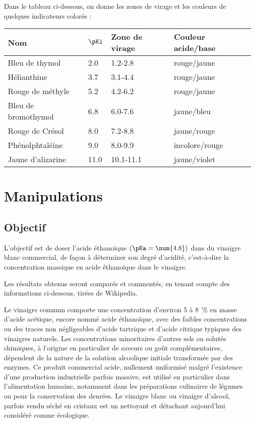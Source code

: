 \documentclass{tp}
\begin{document}
Dans le tableau ci-dessous, on donne les zones de virage et les couleurs de quelques indicateurs colorés :
\begin{center}
  \begin{tabular}{llll}
\toprule
 Nom  & $\pKi$  & Zone de virage & Couleur acide/base  \\
 \midrule
 Bleu de thymol & \num{2.0} & \num{1.2}-\num{2.8} & rouge/jaune \\
 Hélianthine  & \num{3.7} & \num{3.1}-\num{4.4} &  rouge/jaune  \\
 Rouge de méthyle  & \num{5.2} & \num{4.2}-\num{6.2} &  rouge/jaune  \\
 Bleu de bromothymol  & \num{6.8} & \num{6.0}-\num{7.6} &  jaune/bleu  \\
 Rouge de Crésol  & \num{8.0} & \num{7.2}-{8.8} &  jaune/rouge  \\
 Phénolphtaléine  & \num{9.0} & \num{8.0}-\num{9.9} &  incolore/rouge  \\
 Jaune d'alizarine  & \num{11.0} & \num{10.1}-\num{11.1} &  jaune/violet  \\
 \bottomrule
  \end{tabular}
\end{center}

\section{Manipulations}%
\label{sec:manipulations}

\subsection{Objectif}%
\label{sub:objectif}

L'objectif est de doser l'acide éthanoïque $(\pKa=\num{4.8})$ dans du vinaigre blanc commercial, de façon à déterminer son degré d'acidité, c'est-à-dire la concentration massique en acide éthanoïque dans le vinaigre.

Les résultats obtenus seront comparés et commentés, en tenant compte des informations ci-dessous, tirées de Wikipedia.

\begin{mdframed}
Le vinaigre commun comporte une concentration d'environ 5 à \SI{8}{\percent} en masse d'acide acétique, encore nommé acide éthanoïque, avec des faibles concentrations ou des traces non négligeables d'acide tartrique et d'acide citrique typiques des vinaigres naturels. Les concentrations minoritaires d'autres sels ou solutés chimiques, à l'origine en particulier de saveurs ou goût complémentaires, dépendent de la nature de la solution alcoolique initiale transformée par des enzymes. Ce produit commercial acide, nullement uniformisé malgré l'existence d'une production industrielle parfois massive, est utilisé en particulier dans l'alimentation humaine, notamment dans les préparations culinaires de légumes ou pour la conservation des denrées. Le vinaigre blanc ou vinaigre d'alcool, parfois vendu séché en cristaux est un nettoyant et détachant aujourd'hui considéré comme écologique.
\end{mdframed}
\end{document}
